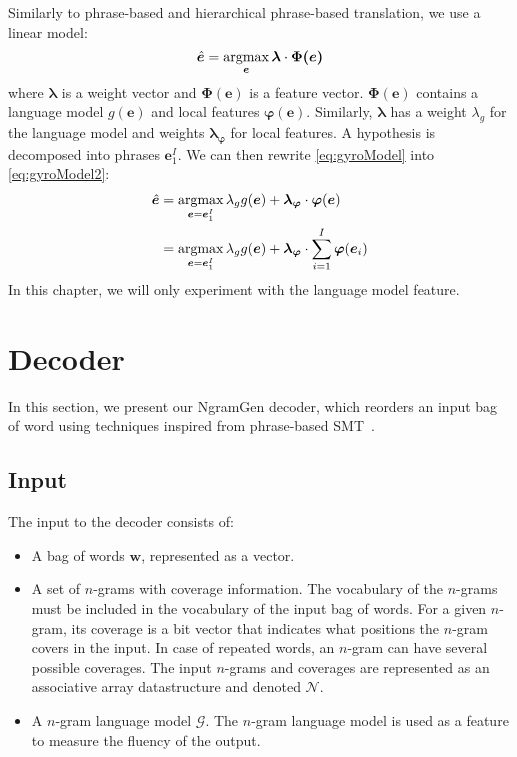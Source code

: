 Similarly to phrase-based and hierarchical phrase-based translation, we
use a linear model:
%
\begin{equation}
  \hat{\bm{e}} = \operatorname*{argmax}_{\bm{e}} \bm{\lambda} \cdot \bm{\Phi(\bm{e})}
  \label{eq:gyroModel}
\end{equation}
%
where $\bm{\lambda}$ is a weight vector and $\bm{\Phi}(\bm{e})$ is
a feature vector. $\bm{\Phi}(\bm{e})$ contains a language model
$g(\bm{e})$ and local features $\bm{\varphi}(\bm{e})$. Similarly,
$\bm{\lambda}$ has a weight $\lambda_g$ for the language model
and weights $\bm{\lambda_{\varphi}}$ for local features. A hypothesis
is decomposed into phrases $\bm{e}_1^I$. We can then rewrite
\autoref{eq:gyroModel} into \autoref{eq:gyroModel2}:
%
\begin{equation}
  \begin{split}
    \hat{\bm{e}} &= \operatorname*{argmax}_{\bm{e} = \bm{e}_1^I} \lambda_{g} g(\bm{e}) + \bm{\lambda_{\varphi}} \cdot \bm{\varphi}(\bm{e}) \\
                 &= \operatorname*{argmax}_{\bm{e} = \bm{e}_1^I} \lambda_{g} g(\bm{e}) + \bm{\lambda_{\varphi}} \cdot \sum_{i = 1}^I \bm{\varphi}(\bm{e}_i) \\
  \end{split}
  \label{eq:gyroModel2}
\end{equation}
%
In this chapter, we will only experiment with the language model feature.

\section{Decoder}

In this section, we present our NgramGen decoder, which reorders
an input bag of word using techniques inspired from phrase-based
SMT~\citep{koehn:2010:book}.

\subsection{Input}

The input to the decoder consists of:
%
\begin{itemize}
  \item A bag of words $\bm{w}$, represented as a vector.
  \item A set of $n$-grams with coverage information. The vocabulary
    of the $n$-grams must be included in the vocabulary of the input
    bag of words. For a given $n$-gram, its coverage is a bit vector
    that indicates what positions the $n$-gram covers in the input.
    In case of repeated words, an $n$-gram can have several possible
    coverages. The input $n$-grams and coverages are represented as
    an associative array datastructure and denoted $\mathcal{N}$.
  \item A $n$-gram language model $\mathcal{G}$. The $n$-gram
    language model is
    used as a feature to measure the fluency of the output.
\end{itemize}

